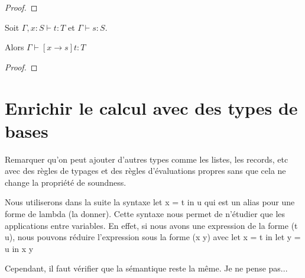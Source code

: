 \begin{proof}
  
\end{proof}

\begin{lemma} 
  Soit $\Gamma, x : S \vdash t : T$ et $\Gamma \vdash s : S$.

  Alors $\Gamma \vdash [x \rightarrow s] t : T$
\end{lemma}

\begin{proof}

\end{proof}

\section{Enrichir le calcul avec des types de bases}

Remarquer qu'on peut ajouter d'autres types comme les listes, les records,
etc avec des règles de typages et des règles d'évaluations propres sans que
cela ne change la propriété de soundness.

Nous utiliserons dans la suite la syntaxe
let x = t in u qui est un alias pour une forme de lambda (la donner).
Cette syntaxe nous permet de n'étudier que les applications entre variables.
En effet, si nous avons une expression de la forme (t u), nous pouvons réduire
l'expression sous la forme (x y) avec
let x = t in
let y = u in
x y

Cependant, il faut vérifier que la sémantique reste la même. Je ne pense pas...